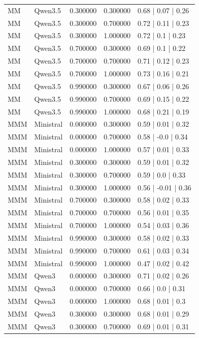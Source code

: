 \begin{longtable}{lllll}
MM & Qwen3.5 & 0.300000 & 0.300000 & 0.68 | 0.07 | 0.26 \\
MM & Qwen3.5 & 0.300000 & 0.700000 & 0.72 | 0.11 | 0.23 \\
MM & Qwen3.5 & 0.300000 & 1.000000 & 0.72 | 0.1 | 0.23 \\
MM & Qwen3.5 & 0.700000 & 0.300000 & 0.69 | 0.1 | 0.22 \\
MM & Qwen3.5 & 0.700000 & 0.700000 & 0.71 | 0.12 | 0.23 \\
MM & Qwen3.5 & 0.700000 & 1.000000 & 0.73 | 0.16 | 0.21 \\
MM & Qwen3.5 & 0.990000 & 0.300000 & 0.67 | 0.06 | 0.26 \\
MM & Qwen3.5 & 0.990000 & 0.700000 & 0.69 | 0.15 | 0.22 \\
MM & Qwen3.5 & 0.990000 & 1.000000 & 0.68 | 0.21 | 0.19 \\
MMM & Ministral & 0.000000 & 0.300000 & 0.59 | 0.01 | 0.32 \\
MMM & Ministral & 0.000000 & 0.700000 & 0.58 | -0.0 | 0.34 \\
MMM & Ministral & 0.000000 & 1.000000 & 0.57 | 0.01 | 0.33 \\
MMM & Ministral & 0.300000 & 0.300000 & 0.59 | 0.01 | 0.32 \\
MMM & Ministral & 0.300000 & 0.700000 & 0.59 | 0.0 | 0.33 \\
MMM & Ministral & 0.300000 & 1.000000 & 0.56 | -0.01 | 0.36 \\
MMM & Ministral & 0.700000 & 0.300000 & 0.58 | 0.02 | 0.33 \\
MMM & Ministral & 0.700000 & 0.700000 & 0.56 | 0.01 | 0.35 \\
MMM & Ministral & 0.700000 & 1.000000 & 0.54 | 0.03 | 0.36 \\
MMM & Ministral & 0.990000 & 0.300000 & 0.58 | 0.02 | 0.33 \\
MMM & Ministral & 0.990000 & 0.700000 & 0.61 | 0.03 | 0.34 \\
MMM & Ministral & 0.990000 & 1.000000 & 0.47 | 0.02 | 0.42 \\
MMM & Qwen3 & 0.000000 & 0.300000 & 0.71 | 0.02 | 0.26 \\
MMM & Qwen3 & 0.000000 & 0.700000 & 0.66 | 0.0 | 0.31 \\
MMM & Qwen3 & 0.000000 & 1.000000 & 0.68 | 0.01 | 0.3 \\
MMM & Qwen3 & 0.300000 & 0.300000 & 0.68 | 0.01 | 0.29 \\
MMM & Qwen3 & 0.300000 & 0.700000 & 0.69 | 0.01 | 0.31 \\

\end{longtable}
